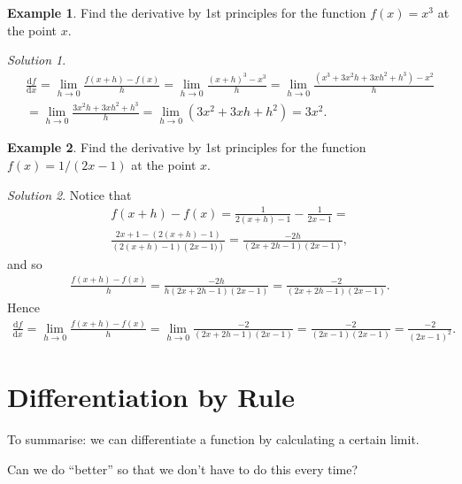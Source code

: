 \documentclass[
  english,
  11pt,
  oneside]{book}
\newcommand{\slide}{}
\theoremstyle{definition}
\theoremstyle{definition}
\newtheorem{example}{Example}[chapter]
\theoremstyle{definition}
\theoremstyle{definition}
\theoremstyle{remark}
\newtheorem*{solution}{Solution}
\begin{document}
\slide

\begin{example}
Find the derivative by 1st principles for the function \(f(x) = x^3\) at the point \(x\).
\end{example}

\begin{solution}
\begin{gather*}
\frac{\mathrm{d} f}{\mathrm{d} x} = \lim\limits_{h\to0}\frac{f(x+h)-f(x)}{h} = \lim\limits_{h\to0}\frac{(x+h)^3 - x^3}{h} = \lim\limits_{h\to0}\frac{(x^3+3x^2h+3xh^2+h^3)-x^2}{h}\\ = \lim\limits_{h\to0}\frac{3x^2h+3xh^2+h^3}{h} = \lim\limits_{h\to0}(3x^2+3xh+h^2) = 3x^2.
\end{gather*}
\end{solution}

\slide

\begin{example}
Find the derivative by 1st principles for the function \(f(x) = 1/(2x-1)\) at the point \(x\).
\end{example}

\begin{solution}
Notice that
\begin{gather*}
f(x+h)-f(x) = \frac{1}{2(x+h)-1} - \frac{1}{2x-1} =\\ \frac{2x+1-\left(2(x+h)-1\right)}{\left(2(x+h)-1\right)\left(2x-1)\right)} = \frac{-2h}{(2x+2h-1)(2x-1)},
\end{gather*}
and so
\begin{gather*}
\frac{f(x+h)-f(x)}{h} = \frac{-2h}{h(2x+2h-1)(2x-1)} = \frac{-2}{(2x+2h-1)(2x-1)}.
\end{gather*}
Hence
\begin{gather*}
\frac{\mathrm{d} f}{\mathrm{d} x} = \lim\limits_{h\to0}\frac{f(x+h)-f(x)}{h} = \lim\limits_{h\to0}\frac{-2}{(2x+2h-1)(2x-1)} = \frac{-2}{(2x-1)(2x-1)} = \frac{-2}{(2x-1)^2}.
\end{gather*}
\end{solution}

\section{Differentiation by Rule}\label{lecture-three}

To summarise: we can differentiate a function by calculating a certain limit.

Can we do ``better'' so that we don't have to do this every time?
\end{document}
